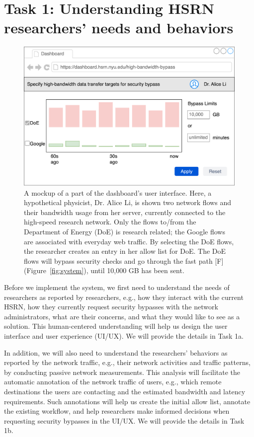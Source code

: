 \section{Task 1: Understanding HSRN researchers' needs and behaviors}

\begin{figure}[t]
    \centering
    \includegraphics[width=0.7\linewidth]{figures/dashboard.png}
    \caption{A mockup of a part of the dashboard's user interface. Here, a hypothetical physicist, Dr. Alice Li, is shown two network flows and their bandwidth usage from her server, currently connected to the high-speed research network. Only the flows to/from the Department of Energy (DoE) is research related; the Google flows are associated with everyday web traffic. By selecting the DoE flows, the researcher creates an entry in her allow list for DoE. The DoE flows will bypass security checks and go through the fast path [F] (Figure~\ref{fig:system}), until 10,000 GB has been sent.}
    \label{fig:dashboard}
\end{figure}

Before we implement the system, we first need to understand the needs of researchers as reported by researchers, e.g., how they interact with the current HSRN, how they currently request security bypasses with the network administrators, what are their concerns, and what they would like to see as a solution. This human-centered understanding will help us design the user interface and user experience (UI/UX). We will provide the details in Task 1a.

In addition, we will also need to understand the researchers' behaviors as reported by the network traffic, e.g., their network activities and traffic patterns, by conducting passive network measurements. This analysis will facilitate the automatic annotation of the network traffic of users, e.g., which remote destinations the users are contacting and the estimated bandwidth and latency requirements. Such annotations will help us create the initial allow list, annotate the existing workflow, and help researchers make informed decisions when requesting security bypasses in the UI/UX. We will provide the details in Task 1b.

